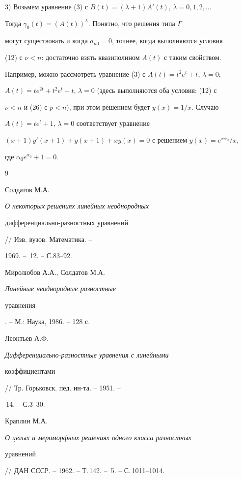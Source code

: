 {3) Возьмем уравнение (3) с $B(t)=(\lambda+1)A'(t)$, $\lambda=0,1,2,\dotsc$


Тогда $\gamma_0(t)=(A(t))^\lambda$. Понятно, что решения типа $\Gamma$


могут существовать и когда $a_{n0}=0$, точнее, когда выполняются условия


(12) с $\nu<n$: достаточно взять квазиполином $A(t)$ с таким свойством.


Например, можно рассмотреть уравнение (3) с $A(t)=t^2e^t+t$, $\lambda=0$;


$A(t)=te^{2t}+t^2e^t+t$, $\lambda=0$ (здесь выполняются оба условия: (12) с


$\nu<n$ и (26) с $p<n$), при этом решением будет $y(x)=1/x$. Случаю


$A(t)=te^t+1$, $\lambda=0$ соответствует уравнение


$(x+1)y'(x+1)+y(x+1)+xy(x)=0$ с решением $y(x)=e^{x\alpha_0}/x$,


где $\alpha_0e^{\alpha_0}+1=0$.





\begin{thebibliography}{9}







Солдатов М.А. {\em О некоторых решениях линейных неоднородных


дифференциально-разностных уравнений} // Изв. вузов. Математика. --


1969. -- \No\,12. -- С.83--92.




Миролюбов А.А., Солдатов М.А. {\em Линейные неоднородные разностные


уравнения}. -- М.: Наука, 1986. -- 128 с.




Леонтьев А.Ф. {\em Дифференциально-разностные уравнения с линейными


коэффициентами} // Тр. Горьковск. пед. ин-та. -- 1951. --


\No\,14. -- С.3--30.




Краплин М.А. {\em О целых и мероморфных решениях одного класса разностных


уравнений} // ДАН СССР. -- 1962. -- Т.\,142. -- \No\,5. -- С.\,1011--1014.





\end{thebibliography}}
